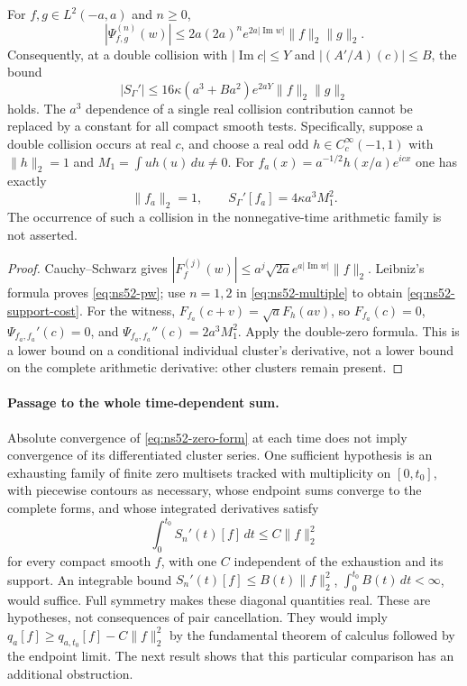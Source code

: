 \begin{proposition}
\label{prop:ns52-support}
For $f,g\in L^2(-a,a)$ and $n\ge0$,
\begin{equation}\label{eq:ns52-pw}
 |\Psi_{f,g}^{(n)}(w)|
 \le 2a(2a)^n e^{2a|\operatorname{Im}w|}\|f\|_2\|g\|_2.
\end{equation}
Consequently, at a double collision with
$|\operatorname{Im}c|\le Y$ and $|(A'/A)(c)|\le B$, the bound
\begin{equation}\label{eq:ns52-support-cost}
 |S_\Gamma'|
 \le16\kappa(a^3+Ba^2)e^{2aY}\|f\|_2\|g\|_2
\end{equation}
holds. The $a^3$ dependence of a single real collision contribution
cannot be replaced by a constant for all compact smooth tests.
Specifically, suppose a double collision occurs at real $c$, and
choose a real odd $h\in C_c^\infty(-1,1)$ with $\|h\|_2=1$ and
$M_1=\int u h(u)\,du\ne0$. For
$f_a(x)=a^{-1/2}h(x/a)e^{icx}$ one has exactly
\begin{equation}\label{eq:ns52-collision-witness}
 \|f_a\|_2=1,\qquad
 S_\Gamma'[f_a]=4\kappa a^3 M_1^2.
\end{equation}
The occurrence of such a collision in the nonnegative-time arithmetic
family is not asserted.
\end{proposition}
\begin{proof}
Cauchy--Schwarz gives
$|F_f^{(j)}(w)|\le a^j\sqrt{2a}e^{a|\operatorname{Im}w|}\|f\|_2$.
Leibniz's formula proves \eqref{eq:ns52-pw}; use $n=1,2$ in
\eqref{eq:ns52-multiple} to obtain \eqref{eq:ns52-support-cost}.
For the witness, $F_{f_a}(c+v)=\sqrt a F_h(av)$, so
$F_{f_a}(c)=0$, $\Psi_{f_a,f_a}'(c)=0$, and
$\Psi_{f_a,f_a}''(c)=2a^3M_1^2$. Apply the double-zero formula.
This is a lower bound on a conditional individual cluster's derivative,
not a lower bound on the complete arithmetic derivative: other clusters
remain present.
\end{proof}

\paragraph{Passage to the whole time-dependent sum.}
Absolute convergence of \eqref{eq:ns52-zero-form} at each time
does not imply convergence of its differentiated cluster series.
One sufficient hypothesis is an exhausting family of finite zero
multisets tracked with multiplicity on $[0,t_0]$, with piecewise
contours as necessary, whose endpoint sums converge to the complete
forms, and whose integrated derivatives satisfy
\[
 \int_0^{t_0}S_n'(t)[f]\,dt\le C\|f\|_2^2
\]
for every compact smooth $f$, with one $C$ independent of the
exhaustion and its support. An integrable bound
$S_n'(t)[f]\le B(t)\|f\|_2^2$, $\int_0^{t_0}B(t)\,dt<\infty$,
would suffice. Full symmetry makes these diagonal quantities real.
These are hypotheses, not consequences of pair cancellation. They
would imply $q_a[f]\ge q_{a,t_0}[f]-C\|f\|_2^2$ by the fundamental
theorem of calculus followed by the endpoint limit. The next result
shows that this particular comparison has an additional obstruction.

